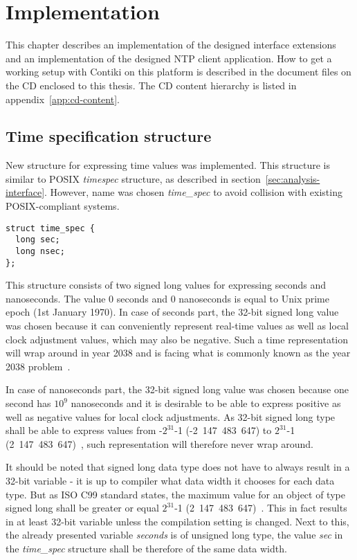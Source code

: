 
\chapter{Implementation}
This chapter describes an implementation of the designed interface extensions
and an implementation of the designed NTP client application.
How to get a working setup with Contiki on this platform is described in
the document files on the CD enclosed to this thesis.
The CD content hierarchy is listed in appendix~\ref{app:cd-content}.


\section{Time specification structure}
New structure for expressing time values was implemented.
This structure is similar to POSIX {\it{timespec}} structure,
as described in section~\ref{sec:analysis-interface}.
However, name was chosen {\it{time\_spec}} to avoid collision with
existing POSIX-compliant systems.
\begin{lstlisting}
struct time_spec {
  long sec;
  long nsec;
};
\end{lstlisting}
This structure consists of two signed long values for expressing seconds and nanoseconds.
The value 0 seconds and 0 nanoseconds is equal to Unix prime epoch (1st January 1970).
In case of seconds part, the 32-bit signed long value was chosen because
it can conveniently
represent real-time values as well as local clock adjustment values, which may also be negative.
Such a time representation will wrap around in year 2038 and is facing
what is commonly known as the year 2038 problem~\cite{posix}.

In case of nanoseconds part, the 32-bit signed long value was chosen because
one second has $10^9$ nanoseconds and it is
desirable to be able to express positive as well as negative values for local clock adjustments.
As 32-bit signed long type shall be able to express values from -$2^{31}$-1 (-2~147~483~647)
to $2^{31}$-1 (2~147~483~647)~\cite{c99},
such representation will therefore never wrap around.

It should be noted that signed long data type does not have to always result in a 32-bit variable -
it is up to compiler what data width it chooses for each data type.
But as ISO C99 standard states, the maximum value for an object of type signed long
shall be greater or equal $2^{31}$-1 (2~147~483~647)~\cite{c99}.
This in fact results in at least 32-bit variable unless the compilation setting is changed.
Next to this, the already presented variable {\it{seconds}} is of unsigned long type,
the value {\it{sec}} in the {\it{time\_spec}} structure %
shall be therefore of the same data width.

